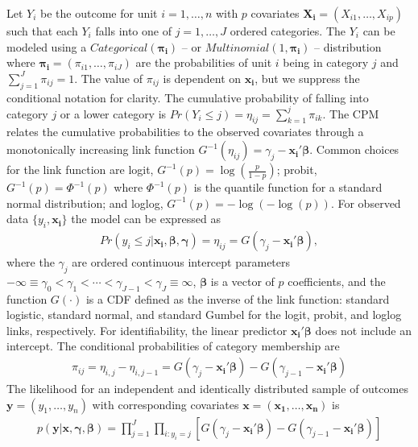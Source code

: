 \documentclass[
]{article}
\begin{document}
Let \(Y_i\) be the outcome for unit \(i=1,\ldots,n\) with \(p\) covariates \(\boldsymbol{X_i}=(X_{i1},\ldots,X_{ip})\) such that each \(Y_i\) falls into one of \(j=1,\ldots, J\) ordered categories. The \(Y_i\) can be modeled using a \(Categorical(\boldsymbol{\pi_i})\) -- or \(Multinomial(1,\boldsymbol{\pi_i})\) -- distribution where \(\boldsymbol{\pi_i}=(\pi_{i1}, \ldots, \pi_{iJ})\) are the probabilities of unit \(i\) being in category \(j\) and \(\sum_{j=1}^{J}\pi_{ij}=1\). The value of \(\pi_{ij}\) is dependent on \(\boldsymbol{x_i}\), but we suppress the conditional notation for clarity. The cumulative probability of falling into category \(j\) or a lower category is \(Pr(Y_i \le j)=\eta_{ij}=\sum_{k=1}^{j}\pi_{ik}\). The CPM relates the cumulative probabilities to the observed covariates through a monotonically increasing link function \(G^{-1}(\eta_{ij})=\gamma_{j}-\boldsymbol{x_i'\beta}\). Common choices for the link function are logit, \(G^{-1}(p)=\log\left(\frac{p}{1-p}\right)\); probit, \(G^{-1}(p)=\Phi^{-1}(p)\) where \(\Phi^{-1}(p)\) is the quantile function for a standard normal distribution; and loglog, \(G^{-1}(p)=-\log(-\log(p))\). For observed data \(\{y_i,\boldsymbol{x_i}\}\) the model can be expressed as
\begin{gather}
Pr(y_i \le j|\boldsymbol{x_i},\boldsymbol{\beta},\boldsymbol{\gamma})=\eta_{ij}=G(\gamma_{j}-\boldsymbol{x_i'\beta}),
\end{gather}
where the \(\gamma_j\) are ordered continuous intercept parameters \(-\infty \equiv \gamma_0 < \gamma_1 < \cdots < \gamma_{J-1} <\gamma_J \equiv \infty\), \(\boldsymbol{\beta}\) is a vector of \(p\) coefficients, and the function \(G(\cdot)\) is a CDF defined as the inverse of the link function: standard logistic, standard normal, and standard Gumbel for the logit, probit, and loglog links, respectively. For identifiability, the linear predictor \(\boldsymbol{x_i'\beta}\) does not include an intercept. The conditional probabilities of category membership are
\begin{gather}
\label{eq:cellprobs}
\pi_{ij}=\eta_{i,j}-\eta_{i,j-1}=G(\gamma_j-\boldsymbol{x_i'\beta})-G(\gamma_{j-1}-\boldsymbol{x_i'\beta})
\end{gather}
The likelihood for an independent and identically distributed sample of outcomes \(\boldsymbol{y}=(y_1,\ldots,y_n)\) with corresponding covariates \(\boldsymbol{x}=(\boldsymbol{x_1},\ldots,\boldsymbol{x_n})\) is
\begin{gather}
p(\boldsymbol{y}|\boldsymbol{x},\boldsymbol{\gamma},\boldsymbol{\beta})=
\prod_{j=1}^{J}\prod_{i:y_i=j}[G(\gamma_j-\boldsymbol{x_i'\beta})-G(\gamma_{j-1}-\boldsymbol{x_i'\beta})]
\end{gather}
\end{document}
